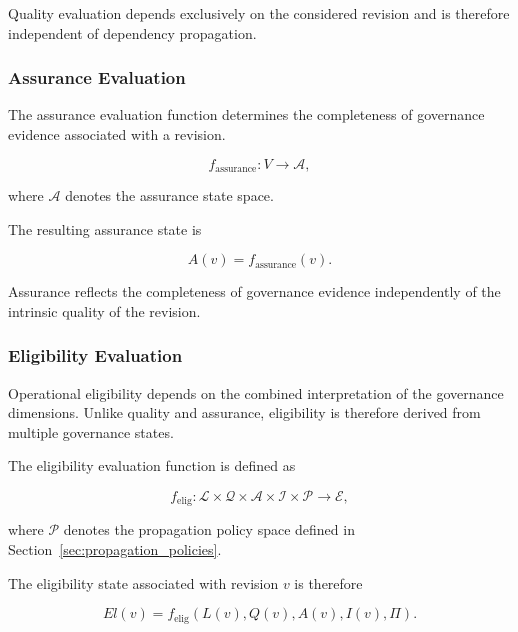 \documentclass[10pt]{article}
\begin{document}
Quality evaluation depends exclusively on the considered revision and is therefore independent of dependency propagation.

\subsubsection{Assurance Evaluation}

The assurance evaluation function determines the completeness of governance evidence associated with a revision.

\begin{equation}
	f_{\mathrm{assurance}} : V \rightarrow \mathcal{A},
	\label{eq:f_assurance}
\end{equation}

where $\mathcal{A}$ denotes the assurance state space.

The resulting assurance state is

\begin{equation}
	A(v)=f_{\mathrm{assurance}}(v).
	\label{eq:assurance_assignment}
\end{equation}

Assurance reflects the completeness of governance evidence independently of the intrinsic quality of the revision.

\subsubsection{Eligibility Evaluation}

Operational eligibility depends on the combined interpretation of the governance dimensions. Unlike quality and assurance, eligibility is therefore derived from multiple governance states.

The eligibility evaluation function is defined as

\begin{equation}
	f_{\mathrm{elig}} :
	\mathcal{L}
	\times
	\mathcal{Q}
	\times
	\mathcal{A}
	\times
	\mathcal{I}
	\times
	\mathcal{P}
	\rightarrow
	\mathcal{E},
	\label{eq:f_elig}
\end{equation}

where $\mathcal{P}$ denotes the propagation policy space defined in Section~\ref{sec:propagation_policies}.

The eligibility state associated with revision $v$ is therefore

\begin{equation}
	El(v)=
	f_{\mathrm{elig}}
	\left(
	L(v),
	Q(v),
	A(v),
	I(v),
	\Pi
	\right).
	\label{eq:eligibility_assignment}
\end{equation}
\end{document}
